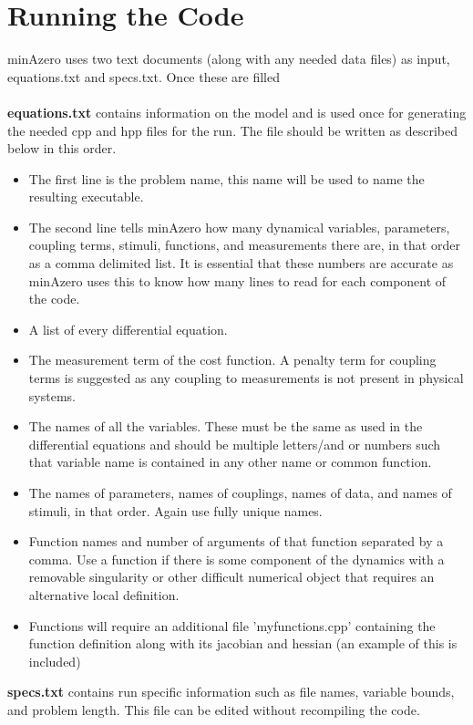 \documentclass{scrartcl}
\newcommand{\bi}{\begin{itemize}}
\newcommand{\ei}{\end{itemize}}
\begin{document}
\pagebreak
\section*{Running the Code}
minAzero uses two text documents (along with any needed data files) as input, equations.txt and specs.txt.  Once these are filled
\\
\bigskip
\\
{\bf equations.txt} contains information on the model and is used once for generating the needed cpp and hpp files for the run.  The file should be written as described below in this order.

\bi
\item The first line is the problem name, this name will be used to name the resulting executable.
\item The second line tells minAzero how many dynamical variables, parameters, coupling terms, stimuli, functions, and measurements there are, in that order as a comma delimited list.  It is essential that these numbers are accurate as minAzero uses this to know how many lines to read for each component of the code.

\item A list of every differential equation.

\item The measurement term of the cost function.  A penalty term for coupling terms is suggested as any coupling to measurements is not present in physical systems.

\item The names of all the variables.  These must be the same as used in the differential equations and should be multiple letters/and or numbers such that variable name is contained in any other name or common function.
\item The names of parameters, names of couplings, names of data, and names of stimuli, in that order.  Again use fully unique names.
\item Function names and number of arguments of that function separated by a comma.  Use a function if there is some component of the dynamics with a removable singularity or other difficult numerical object that requires an alternative local definition.
\item Functions will require an additional file 'myfunctions.cpp' containing the function definition along with its jacobian and hessian (an example of this is included)
\ei
\bigskip
\pagebreak
{\bf specs.txt} contains run specific information such as file names, variable bounds, and problem length.  This file can be edited without recompiling the code.
\end{document}
